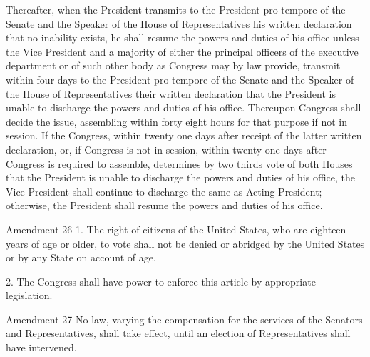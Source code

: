 \documentclass[12pt,a4paper]{article}
\begin{document}
Thereafter, when the President transmits to the President pro tempore of the
Senate and the Speaker of the House of Representatives his written declaration
that no inability exists, he shall resume the powers and duties of his office
unless the Vice President and a majority of either the principal officers of
the executive department or of such other body as Congress may by law provide,
transmit within four days to the President pro tempore of the Senate and the
Speaker of the House of Representatives their written declaration that the
President is unable to discharge the powers and duties of his office. Thereupon
Congress shall decide the issue, assembling within forty eight hours for that
purpose if not in session. If the Congress, within twenty one days after
receipt of the latter written declaration, or, if Congress is not in session,
within twenty one days after Congress is required to assemble, determines by
two thirds vote of both Houses that the President is unable to discharge the
powers and duties of his office, the Vice President shall continue to discharge
the same as Acting President; otherwise, the President shall resume the powers
and duties of his office.

Amendment 26
1. The right of citizens of the United States, who are eighteen years of age or
older, to vote shall not be denied or abridged by the United States or by any
State on account of age.

2. The Congress shall have power to enforce this article by appropriate
legislation.

Amendment 27
No law, varying the compensation for the services of the Senators and
Representatives, shall take effect, until an election of Representatives shall
have intervened.
\end{document}
